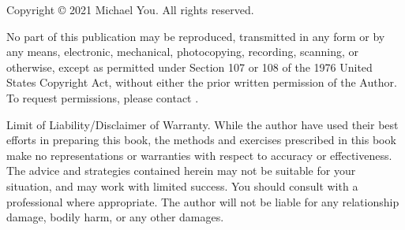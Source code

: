 \documentclass[10pt, twoside, ebook]{memoir}
\begin{document}
\begin{titlingpage}
  
\end{titlingpage}

\maketitle

\clearpage
\thispagestyle{empty}
\null\vfill
\begin{flushleft}
  Copyright © 2021 Michael You. All rights reserved.
  \bigskip

  No part of this publication may be reproduced, transmitted in any form or by any
  means, electronic, mechanical, photocopying, recording, scanning, or otherwise,
  except as permitted under Section 107 or 108 of the 1976 United States Copyright
  Act, without either the prior written permission of the Author. To request
  permissions, please contact
  \href{mailto:viridity.capital@gmail.com}{}.
  \bigskip

  Limit of Liability/Disclaimer of Warranty. While the author have used their best
  efforts in preparing this book, the methods and exercises prescribed in this
  book make no representations or warranties with respect to accuracy or
  effectiveness. The advice and strategies contained herein may not be suitable
  for your situation, and may work with limited success. You should consult with a
  professional where appropriate. The author will not be liable for any
  relationship damage, bodily harm, or any other damages.
  \bigskip
\end{flushleft}

\frontmatter
\tableofcontents*



\mainmatter


\appendix


\backmatter



\printglossaries

\printindex

\cleartoverso

\end{document}
